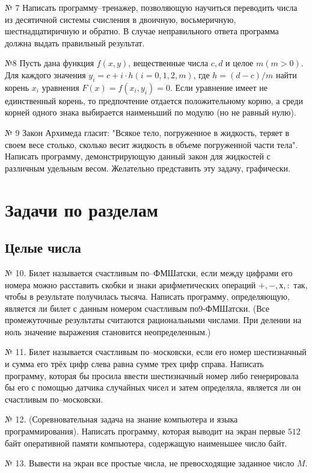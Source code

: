 № 7 Написать программу--тренажер, позволяющую научиться переводить числа из десятичной системы счисления в двоичную, восьмеричную, шестнадцатиричную и обратно. В случае неправильного ответа программа должна выдать правильный результат.

№8 Пусть дана функция $f(x,y)$, вещественные числа $c, d$ и целое $m (m>0)$. Для каждого значения $y_i = c + i\cdot h (i= 0,1,2, m)$, где $h = (d-c)/m$ найти корень $x_i$ уравнения $F(x) = f(x_i, y_i) = 0$. Если уравнение имеет не единственный корень, то предпочтение отдается положительному корню, а среди корней одного знака выбирается наименьший по модулю (но не равный нулю).

№ 9 Закон Архимеда гласит: "Всякое тело, погруженное в жидкость, теряет в своем весе столько, сколько весит жидкость в объеме погруженной части тела". Написать программу, демонстрирующую данный закон для жидкостей с различным удельным весом. Желательно представить эту задачу, графически.

\section{Задачи по разделам}

\subsection{Целые числа}

№ 10. Билет называется счастливым по--ФМШатски, если между цифрами его номера можно расставить скобки и знаки арифметических операций $+, -, х , :$ так, чтобы в результате получилась тысяча. Написать программу, определяющую, является ли билет с данным номером счастливым по9-ФМШатски. (Все промежуточные результаты считаются рациональными числами. При делении на ноль значение выражения становится неопределенным.)

№ 11. Билет называется счастливым по--московски, если его номер шестизначный и сумма его трёх цифр слева равна сумме трех цифр справа. Написать программу, которая бы просила ввести шестизначный номер либо генерировала бы его с помощью датчика случайных чисел и затем определяла, является ли он счастливым по--московски.

№ 12. (Соревновательная задача на знание компьютера и языка программирования). Написать программу, которая выводит на экран первые $512$ байт оперативной памяти компьютера, содержащую наименьшее число байт.

№ 13. Вывести на экран все простые числа, не превосходящие заданное число $M$.

